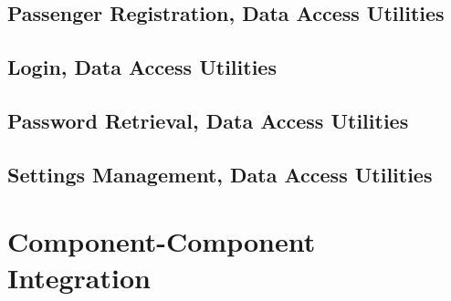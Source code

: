 \documentclass[11pt,oneside,a4paper]{report}
\begin{document}
\section{Passenger Registration, Data Access Utilities}

\section{Login, Data Access Utilities}

\section{Password Retrieval, Data Access Utilities}

\section{Settings Management, Data Access Utilities}


\chapter{Component-Component Integration}
\end{document}
